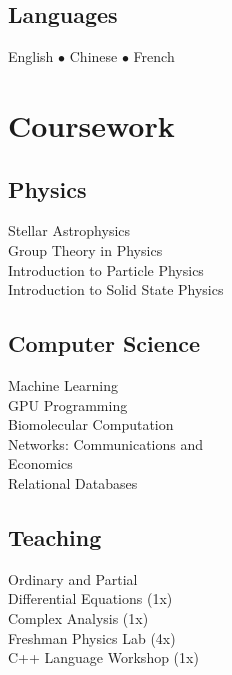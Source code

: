 \documentclass[]{deedy-resume-openfont}
\begin{document}
\begin{minipage}[t]{0.33\textwidth}
    \subsection{Languages}
    English $\bullet$ Chinese $\bullet$ French
    \sectionsep




\section{Coursework}
    \subsection{Physics}
        Stellar Astrophysics\\
        Group Theory in Physics\\
        Introduction to Particle Physics\\
        Introduction to Solid State Physics\\
    \sectionsep

    \subsection{Computer Science}
        Machine Learning\\
        GPU Programming\\
        Biomolecular Computation\\
        Networks: Communications and\\
            \tab Economics\\
        Relational Databases
    \sectionsep

    \subsection{Teaching}
        Ordinary and Partial\\
            \tab Differential Equations (1x)\\
        Complex Analysis (1x)\\
        Freshman Physics Lab (4x)\\
        C++ Language Workshop (1x)
    \sectionsep

%
%

\end{minipage}
\end{document}

